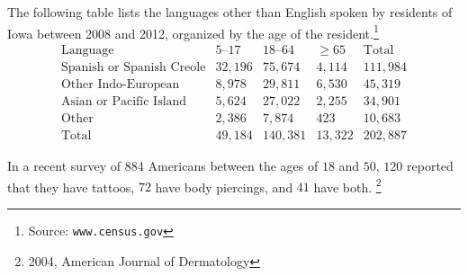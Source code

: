 \documentclass[answers,addpoints,12pt]{exam}
\begin{document}
\begin{questions}
\question[18] The following table lists
the languages other than English spoken by residents
of Iowa between 2008 and 2012, organized by the age
of the resident.\footnote{Source: {\tt www.census.gov}}
\[\begin{array}{r|rrr|r}
\text{Language}&\text{$5$--$17$}
&\text{$18$--$64$}&\ge 65&\text{Total}\\\hline
\text{Spanish or Spanish Creole}&32,196&75,674&4,114&111,984\\
\text{Other Indo-European}&8,978&29,811&6,530&45,319\\
\text{Asian or Pacific Island}&5,624&27,022&2,255&34,901\\
\text{Other}&2,386&7,874&423&10,683\\\hline
\text{Total}&49,184&140,381&13,322&202,887
\end{array}\]
\newpage

\question[24] In a recent survey of 884 Americans between the ages
of $18$ and $50$, $120$ reported that they have tattoos,
$72$ have body piercings, and $41$ have both.
\footnote{2004, American Journal of Dermatology}

\begin{parts}

\end{parts}
\end{questions}
\end{document}
